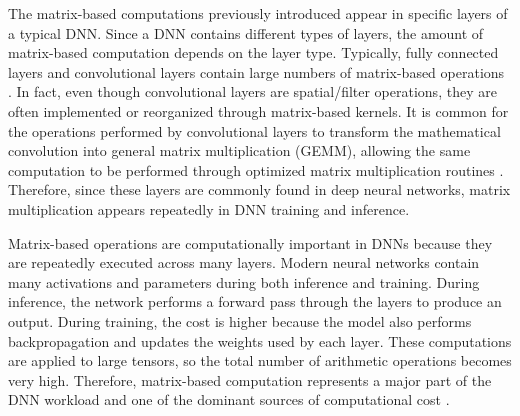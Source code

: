 

The matrix-based computations previously introduced appear in specific
layers of a typical DNN. Since a DNN
contains different types of layers, the amount of matrix-based computation
depends on the layer type. Typically, fully connected layers and
convolutional layers contain large numbers of matrix-based operations
\cite{higham2018deeplearning}. In fact, even though convolutional layers
are spatial/filter operations, they are often implemented or reorganized
through matrix-based kernels. It is common for the operations performed by
convolutional layers to transform the mathematical convolution into
general matrix multiplication (GEMM), allowing the same computation to be
performed through optimized matrix multiplication routines
\cite{anderson2017lowmemory}. Therefore, since these layers are commonly found in deep neural networks, matrix multiplication appears repeatedly in DNN
training and inference.


Matrix-based operations are computationally important in DNNs because they are repeatedly executed across many layers. Modern neural networks contain many activations and parameters during both inference and training. During inference, the network performs a forward pass through the layers to produce an output. During training, the cost is higher because the model also performs backpropagation and updates the weights used by each layer. These computations are applied to large tensors, so the total number of arithmetic operations becomes very high. Therefore, matrix-based computation represents a major part of the DNN workload and one of the dominant sources of computational cost \cite{sze2017efficient}.


